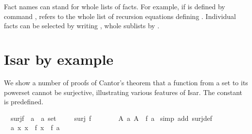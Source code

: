 \begin{isabellebody}
\begin{isamarkuptext}
Fact names can stand for whole lists of facts. For example, if  is
defined by command ,  refers to the whole list of
recursion equations defining . Individual facts can be selected by
writing , whole sublists by .


\section{Isar by example}

We show a number of proofs of Cantor's theorem that a function from a set to
its powerset cannot be surjective, illustrating various features of Isar. The
constant  is predefined.%
\end{isamarkuptext}%
\isamarkuptrue%
\isamarkupfalse%
\ {}{}\ surj{}f\ {}{}\ {}a\ {}\ {}a\ set{}{}\isanewline
%
\isadelimproof
%
\endisadelimproof
%
\isatagproof
{}\isamarkupfalse%
\isanewline
\ \ \isamarkupfalse%
\ {}{}\ {}surj\ f{}\isanewline
\ \ \isamarkupfalse%
\ {}\ \isamarkupfalse%
\ {}{}\ {}{}A{}\ {}a{}\ A\ {}\ f\ a{}\ \isamarkupfalse%
{}simp\ add{}\ surj{}def{}\isanewline
\ \ \isamarkupfalse%
\ {}\ \isamarkupfalse%
\ {}{}\ {}{}a{}\ {}x{}\ x\ {}\ f\ x{}\ {}\ f\ a{}\ \isamarkupfalse%

\end{isabellebody}
